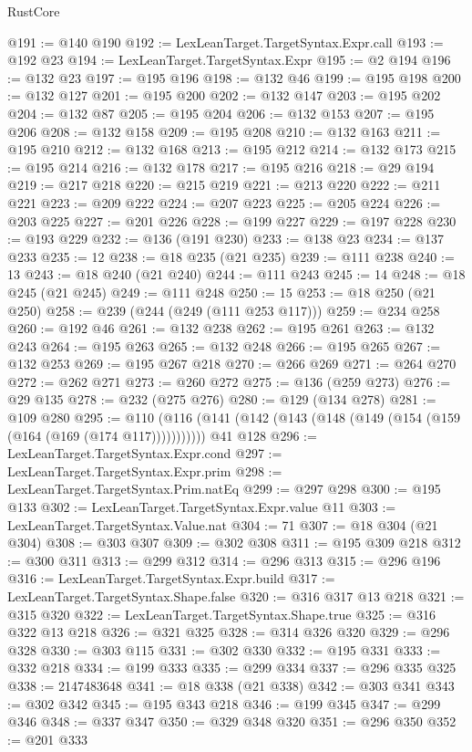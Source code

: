 \begin{lexlean}{RustCore}
\begin{coremodule}
@191 := @140 @190
@192 := LexLeanTarget.TargetSyntax.Expr.call
@193 := @192 @23
@194 := LexLeanTarget.TargetSyntax.Expr
@195 := @2 @194
@196 := @132 @23
@197 := @195 @196
@198 := @132 @46
@199 := @195 @198
@200 := @132 @127
@201 := @195 @200
@202 := @132 @147
@203 := @195 @202
@204 := @132 @87
@205 := @195 @204
@206 := @132 @153
@207 := @195 @206
@208 := @132 @158
@209 := @195 @208
@210 := @132 @163
@211 := @195 @210
@212 := @132 @168
@213 := @195 @212
@214 := @132 @173
@215 := @195 @214
@216 := @132 @178
@217 := @195 @216
@218 := @29 @194
@219 := @217 @218
@220 := @215 @219
@221 := @213 @220
@222 := @211 @221
@223 := @209 @222
@224 := @207 @223
@225 := @205 @224
@226 := @203 @225
@227 := @201 @226
@228 := @199 @227
@229 := @197 @228
@230 := @193 @229
@232 := @136 (@191 @230)
@233 := @138 @23
@234 := @137 @233
@235 := 12
@238 := @18 @235 (@21 @235)
@239 := @111 @238
@240 := 13
@243 := @18 @240 (@21 @240)
@244 := @111 @243
@245 := 14
@248 := @18 @245 (@21 @245)
@249 := @111 @248
@250 := 15
@253 := @18 @250 (@21 @250)
@258 := @239 (@244 (@249 (@111 @253 @117)))
@259 := @234 @258
@260 := @192 @46
@261 := @132 @238
@262 := @195 @261
@263 := @132 @243
@264 := @195 @263
@265 := @132 @248
@266 := @195 @265
@267 := @132 @253
@269 := @195 @267 @218
@270 := @266 @269
@271 := @264 @270
@272 := @262 @271
@273 := @260 @272
@275 := @136 (@259 @273)
@276 := @29 @135
@278 := @232 (@275 @276)
@280 := @129 (@134 @278)
@281 := @109 @280
@295 := @110
    (@116 (@141 (@142 (@143 (@148 (@149 (@154 (@159 (@164 (@169 (@174 @117)))))))))))
    @41
    @128
@296 := LexLeanTarget.TargetSyntax.Expr.cond
@297 := LexLeanTarget.TargetSyntax.Expr.prim
@298 := LexLeanTarget.TargetSyntax.Prim.natEq
@299 := @297 @298
@300 := @195 @133
@302 := LexLeanTarget.TargetSyntax.Expr.value @11
@303 := LexLeanTarget.TargetSyntax.Value.nat
@304 := 71
@307 := @18 @304 (@21 @304)
@308 := @303 @307
@309 := @302 @308
@311 := @195 @309 @218
@312 := @300 @311
@313 := @299 @312
@314 := @296 @313
@315 := @296 @196
@316 := LexLeanTarget.TargetSyntax.Expr.build
@317 := LexLeanTarget.TargetSyntax.Shape.false
@320 := @316 @317 @13 @218
@321 := @315 @320
@322 := LexLeanTarget.TargetSyntax.Shape.true
@325 := @316 @322 @13 @218
@326 := @321 @325
@328 := @314 @326 @320
@329 := @296 @328
@330 := @303 @115
@331 := @302 @330
@332 := @195 @331
@333 := @332 @218
@334 := @199 @333
@335 := @299 @334
@337 := @296 @335 @325
@338 := 2147483648
@341 := @18 @338 (@21 @338)
@342 := @303 @341
@343 := @302 @342
@345 := @195 @343 @218
@346 := @199 @345
@347 := @299 @346
@348 := @337 @347
@350 := @329 @348 @320
@351 := @296 @350
@352 := @201 @333

\end{coremodule}
\end{lexlean}
